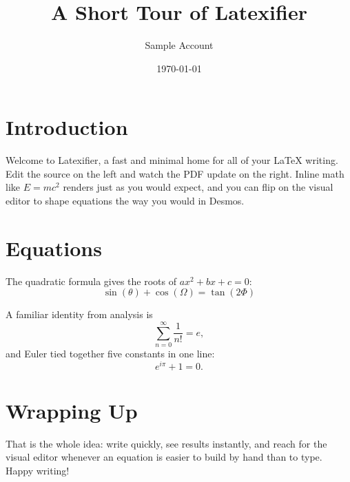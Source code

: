 \documentclass[11pt]{article}
\title{A Short Tour of Latexifier}
\author{Sample Account}
\date{\today}
\begin{document}
\maketitle

\section{Introduction}

Welcome to Latexifier, a fast and minimal home for all of your LaTeX writing.
Edit the source on the left and watch the PDF update on the right. Inline
math like $E = mc^2$ renders just as you would expect, and you can flip on
the visual editor to shape equations the way you would in Desmos.

\section{Equations}

The quadratic formula gives the roots of $ax^2 + bx + c = 0$:
\[
  \sin\left(\theta\right)+\cos\left(\Omega\right)=\tan\left(2\Phi\right)
\]

A familiar identity from analysis is
\[
  \sum_{n=0}^{\infty} \frac{1}{n!} = e,
\]
and Euler tied together five constants in one line:
\[
  e^{i\pi} + 1 = 0.
\]

\section{Wrapping Up}

That is the whole idea: write quickly, see results instantly, and reach for
the visual editor whenever an equation is easier to build by hand than to
type. Happy writing!
\end{document}
